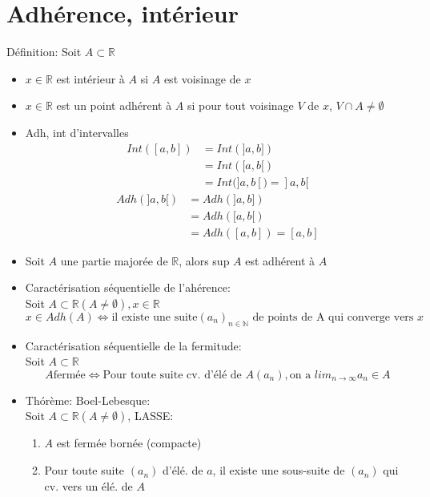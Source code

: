 \documentclass[fleqn]{article}
\begin{document}
\section{Adh\'erence, int\'erieur}
D\'efinition: Soit $A \subset \mathbb{R}$
\begin{itemize}
	\item $x \in \mathbb{R}$ est int\'erieur \`a $A$ si $A$ est voisinage de $x$
	\item $x \in \mathbb{R}$ est un point adh\'erent \`a $A$ si pour tout voisinage $V$ de $x$, $V \cap A \neq \emptyset$
\end{itemize}
\begin{itemize}
	\item Adh, int d'intervalles
		\begin{align*}
			Int([a,b]) &= Int(]a,b]) \\
					   &= Int([a,b[) \\
					   &= Int(]a,b[) = ]a,b[
		\end{align*}
		\begin{align*}
			Adh(]a,b[) &= Adh(]a,b]) \\
					   &= Adh([a,b[) \\
					   &= Adh([a,b]) = [a,b]
		\end{align*}
	\item Soit $A$ une partie major\'ee de $\mathbb{R}$, alors sup $A$ est adh\'erent \`a $A$
	\item Caract\'erisation s\'equentielle de l'ah\'erence: \\
		Soit $A \subset \mathbb{R} (A \neq \emptyset), x \in \mathbb{R}$
		\[x \in Adh(A) \Leftrightarrow \text{il existe une suite} (a_n)_{n \in \mathbb{N}} \text{ de points de A qui converge vers } x\]
	\item Caract\'erisation s\'equentielle de la fermitude: \\ 
		Soit $A \subset \mathbb{R}$
		\[A \text{ferm\'ee} \Leftrightarrow \text{Pour toute suite cv. d'\'el\'e de } A (a_n), \text{on a } lim_{n \to \infty} a_n \in A\]
	\item Th\'or\`eme: Boel-Lebesque: \\
		Soit $A \subset \mathbb{R} (A \neq \emptyset)$, LASSE:
		\begin{enumerate}
			\item $A$ est ferm\'ee born\'ee (compacte)
			\item Pour toute suite $(a_n)$ d'\'el\'e. de $a$, il existe une sous-suite de $(a_n)$ qui cv. vers un \'el\'e. de $A$
		\end{enumerate}
\end{itemize}
\end{document}
